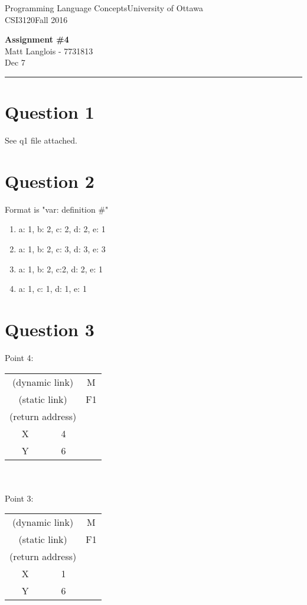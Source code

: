 \documentclass[fleqn, 12pt]{article}
\newcommand{\name}{Matt Langlois}
\newcommand{\studentNumber}{7731813}
\newcommand{\semester}{Fall 2016}
\newcommand{\assignemntNumber}{4}
\newcommand{\dueDate}{Dec 7}
\newcommand{\courseCode}{CSI3120}
\newcommand{\courseTitle}{Programming Language Concepts}
\newcommand{\makeheader}{
    \noindent
    \courseTitle \hfill University of Ottawa\\
    \courseCode \hfill \semester
    \begin{center}
        \textbf{Assignment \#\assignemntNumber}\\
        \name \hspace{1pt} - \studentNumber\\
        \dueDate\\ 
    \end{center}
    \vspace{6pt}
    \hrule
}
\begin{document}
\thispagestyle{firstpage}
\makeheader

\section*{Question 1}

See q1 file attached.

\section*{Question 2}

Format is "var: definition \#"

\begin{enumerate}
    \item 
        a: 1, b: 2, c: 2, d: 2, e: 1 
    \item 
        a: 1, b: 2, c: 3, d: 3, e: 3 
    \item 
        a: 1, b: 2, c:2, d: 2, e: 1 
    \item 
        a: 1, c: 1, d: 1, e: 1 
\end{enumerate}

\section*{Question 3}

Point 4:\\

\begin{tabular}{ | c | c | c}
    \cline{1-2}
    \multicolumn{2}{|c|}{(dynamic link)} & M \\\cline{1-2}
    \multicolumn{2}{|c|}{(static link)} & F1 \\\cline{1-2}
    \multicolumn{2}{|c|}{(return address)} \\\cline{1-2}
    X & 4\\\cline{1-2}
    Y & 6\\\cline{1-2}
\end{tabular}\\\\

Point 3:\\

\begin{tabular}{ | c | c | c}
    \cline{1-2}
    \multicolumn{2}{|c|}{(dynamic link)} & M \\\cline{1-2}
    \multicolumn{2}{|c|}{(static link)} & F1 \\\cline{1-2}
    \multicolumn{2}{|c|}{(return address)} \\\cline{1-2}
    X & 1\\\cline{1-2}
    Y & 6\\\cline{1-2}
\end{tabular}\\\\
\end{document}
